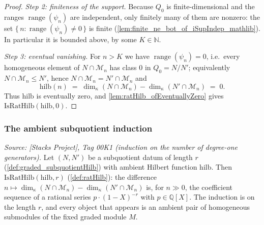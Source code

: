 \begin{proof}
  \emph{Step 2: finiteness of the support.} Because \(Q_0\) is finite-dimensional and
  the ranges \(\operatorname{range}(\psi_n)\) are independent, only finitely many of
  them are nonzero: the set \(\{\,n : \operatorname{range}(\psi_n) \ne 0\,\}\) is
  finite (\cref{lem:finite_ne_bot_of_iSupIndep_mathlib}). In particular it is bounded
  above, by some \(K \in \mathbb{N}\).

  \emph{Step 3: eventual vanishing.} For \(n > K\) we have
  \(\operatorname{range}(\psi_n) = 0\), i.e.\ every homogeneous element of
  \(N \cap \mathcal{M}_n\) has class \(0\) in \(Q_0 = N/N'\); equivalently
  \(N \cap \mathcal{M}_n \le N'\), hence \(N \cap \mathcal{M}_n = N' \cap \mathcal{M}_n\)
  and
  \[
    \mathrm{hilb}(n) \;=\; \dim_\kappa(N \cap \mathcal{M}_n)
      - \dim_\kappa(N' \cap \mathcal{M}_n) \;=\; 0 .
  \]
  Thus \(\mathrm{hilb}\) is eventually zero, and
  \cref{lem:ratHilb_ofEventuallyZero} gives \(\mathrm{IsRatHilb}(\mathrm{hilb}, 0)\).
\end{proof}

\subsubsection*{The ambient subquotient induction}

\begin{lemma}\leanok
  \label{lem:graded_subquotient_isRatHilb}
  \textit{Source: [Stacks Project], Tag 00K1 (induction on the number of
  degree-one generators).}
  Let \((N, N')\) be a subquotient datum of length \(r\)
  (\cref{def:graded_subquotientHilb}) with ambient Hilbert function
  \(\mathrm{hilb}\). Then \(\mathrm{IsRatHilb}(\mathrm{hilb}, r)\)
  (\cref{def:ratHilb}): the difference \(n \mapsto \dim_\kappa(N \cap \mathcal{M}_n)
  - \dim_\kappa(N' \cap \mathcal{M}_n)\) is, for \(n \gg 0\), the coefficient
  sequence of a rational series \(p \cdot (1 - X)^{-r}\) with \(p \in
  \mathbb{Q}[X]\). The induction is on the length \(r\), and every object that
  appears is an ambient pair of homogeneous submodules of the fixed graded module
  \(M\).
\end{lemma}

